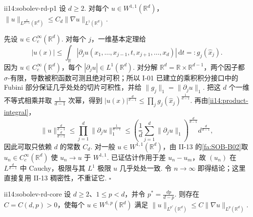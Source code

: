 \begin{FALemma}[B][全空间 \(\displaystyle p=1\) Sobolev 估计]{ii14:sobolev-rd-p1}
设 \(\displaystyle d\geqslant2\). 对每个 \(\displaystyle u\in W^{1,1}(\mathbb R^d)\)， \(\displaystyle \|u\|_{L^{\frac{d}{d-1}}(\mathbb R^d)} \leqslant C_d\|\nabla u\|_{L^1(\mathbb R^d)}.\)
\end{FALemma}

\begin{FAProof}
先设 \(\displaystyle u\in C_c^\infty(\mathbb R^d)\). 对每个 \(\displaystyle j\)，一维基本定理给
\[
|u(x)|
\leqslant
\int_{\mathbb R}|\partial_ju(x_1,\dots,x_{j-1},t,x_{j+1},\dots,x_d)|\,\mathrm{d}t
=:g_j(\widehat x_j).
\]
因为 \(\displaystyle u\in C_c^\infty(\mathbb R^d)\)，每个 \(\displaystyle|\partial_ju|\in L^1(\mathbb R^d)\). 对分解 \(\displaystyle\mathbb R^d=\mathbb R\times\mathbb R^{d-1}\)，两个因子都 \(\displaystyle\sigma\)-有限，导数被积函数可测且绝对可积；所以 I-01 已建立的乘积积分接口中的 Fubini 部分保证几乎处处的切片可积性，并给 \(\displaystyle\|g_j\|_1=\|\partial_ju\|_1\). 把这 \(\displaystyle d\) 个一维不等式相乘并取 \(\displaystyle\frac{1}{d-1}\) 次幂，得到 \(\displaystyle|u(x)|^{\frac{d}{d-1}}\leqslant\prod_jg_j(\widehat x_j)^{\frac{1}{d-1}}\). 再由\autoref{ii14:product-integral}，
\[
\|u\|_{\frac{d}{d-1}}^{\frac{d}{d-1}}
\leqslant
\prod_{j=1}^d\|\partial_ju\|_1^{\frac{1}{d-1}}
\leqslant
\left(\frac1d\sum_{j=1}^d\|\partial_ju\|_1\right)^{\frac{d}{d-1}}d^{\frac{d}{d-1}},
\]
因此可取只依赖 \(\displaystyle d\) 的常数 \(\displaystyle C_d\). 对一般 \(\displaystyle u\in W^{1,1}(\mathbb R^d)\)，由 II-13 的\autoref{fa:SOB-B02}取 \(\displaystyle u_n\in C_c^\infty(\mathbb R^d)\) 使 \(\displaystyle u_n\to u\) 于 \(\displaystyle W^{1,1}\). 已证估计作用于差 \(\displaystyle u_n-u_m\)，故 \(\displaystyle(u_n)\) 在 \(\displaystyle L^{\frac{d}{d-1}}\) 中 Cauchy，极限与其 \(\displaystyle L^1\) 极限 \(\displaystyle u\) 几乎处处一致. 令 \(\displaystyle n\to\infty\) 即得结论；这里直接复用 II-13 稠密性，不重证它.
\hfill\(\square\)
\end{FAProof}

\begin{FATheorem}{ii14:sobolev-rd-core}
设 \(\displaystyle d\geqslant2\)、\(\displaystyle1\leqslant p<d\)，并令 \(\displaystyle p^*=\frac{dp}{d-p}\). 则存在 \(\displaystyle C=C(d,p)>0\)，使每个 \(\displaystyle u\in W^{1,p}(\mathbb R^d)\) 满足 \(\displaystyle \|u\|_{L^{p^*}(\mathbb R^d)} \leqslant C\|\nabla u\|_{L^p(\mathbb R^d)}.\)
\end{FATheorem}

